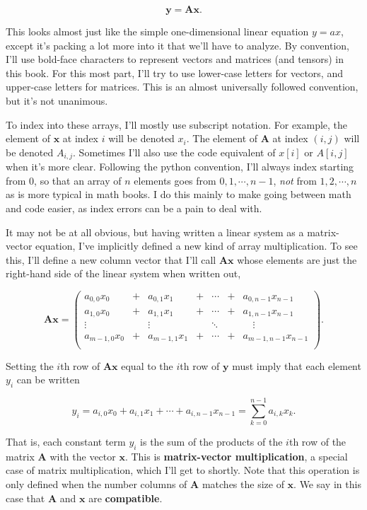 \documentclass[
  letterpaper,
  DIV=11,
  numbers=noendperiod]{scrreprt}
\begin{document}
\[\mathbf{y} = \mathbf{A} \mathbf{x}.\]

This looks almost just like the simple one-dimensional linear equation
\(y=ax\), except it's packing a lot more into it that we'll have to
analyze. By convention, I'll use bold-face characters to represent
vectors and matrices (and tensors) in this book. For this most part,
I'll try to use lower-case letters for vectors, and upper-case letters
for matrices. This is an almost universally followed convention, but
it's not unanimous.

To index into these arrays, I'll mostly use subscript notation. For
example, the element of \(\mathbf{x}\) at index \(i\) will be denoted
\(x_i\). The element of \(\mathbf{A}\) at index \((i,j)\) will be
denoted \(A_{i,j}\). Sometimes I'll also use the code equivalent of
\(x[i]\) or \(A[i,j]\) when it's more clear. Following the python
convention, I'll always index starting from \(0\), so that an array of
\(n\) elements goes from \(0, 1, \cdots, n-1\), \emph{not} from
\(1, 2, \cdots, n\) as is more typical in math books. I do this mainly
to make going between math and code easier, as index errors can be a
pain to deal with.

It may not be at all obvious, but having written a linear system as a
matrix-vector equation, I've implicitly defined a new kind of array
multiplication. To see this, I'll define a new column vector that I'll
call \(\mathbf{A} \mathbf{x}\) whose elements are just the right-hand
side of the linear system when written out,

\[
\mathbf{A} \mathbf{x} = 
\begin{pmatrix}
a_{0,0}x_0 & + & a_{0,1}x_1 & + & \cdots & + & a_{0,n-1}x_{n-1} \\
a_{1,0}x_0 & + & a_{1,1}x_1 & + & \cdots & + & a_{1,n-1}x_{n-1} \\
\vdots    &   & \vdots    &   &  \ddots  &   & \quad \vdots     \\
a_{m-1,0}x_0 & + & a_{m-1,1}x_1 & + & \cdots & + & a_{m-1,n-1}x_{n-1} \\
\end{pmatrix}.
\]

Setting the \(i\)th row of \(\mathbf{A} \mathbf{x}\) equal to the
\(i\)th row of \(\mathbf{y}\) must imply that each element \(y_i\) can
be written

\[y_i = a_{i,0}x_0 + a_{i,1}x_1 + \cdots + a_{i,n-1}x_{n-1} = \sum_{k=0}^{n-1} a_{i,k}x_k.\]

That is, each constant term \(y_i\) is the sum of the products of the
\(i\)th row of the matrix \(\mathbf{A}\) with the vector \(\mathbf{x}\).
This is \textbf{matrix-vector multiplication}, a special case of matrix
multiplication, which I'll get to shortly. Note that this operation is
only defined when the number columns of \(\mathbf{A}\) matches the size
of \(\mathbf{x}\). We say in this case that \(\mathbf{A}\) and
\(\mathbf{x}\) are \textbf{compatible}.
\end{document}
